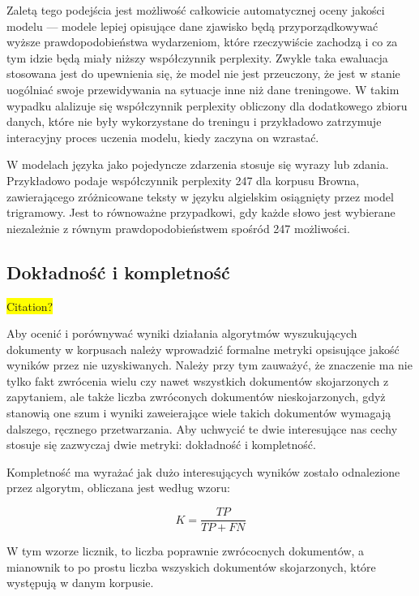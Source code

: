 \documentclass[11pt,a4paper]{article}
\newcommand{\todo}[1]{\colorbox{yellow}{#1}}
\begin{document}
Zaletą tego podejścia jest możliwość całkowicie automatycznej oceny jakości
modelu --- modele lepiej opisujące dane zjawisko będą przyporządkowywać wyższe
prawdopodobieństwa wydarzeniom, które rzeczywiście zachodzą i co za tym idzie
będą miały niższy współczynnik perplexity. Zwykle taka ewaluacja stosowana jest
do upewnienia się, że model nie jest przeuczony, że jest w stanie uogólniać
swoje przewidywania na sytuacje inne niż dane treningowe. W takim wypadku
alalizuje się współczynnik perplexity obliczony dla dodatkowego zbioru
danych, które nie były wykorzystane do treningu i przykładowo zatrzymuje
interacyjny proces uczenia modelu, kiedy zaczyna on wzrastać.

W modelach języka jako pojedyncze zdarzenia stosuje się wyrazy lub zdania.
Przykładowo \cite{perplexity-estimate} podaje współczynnik perplexity 247 dla
korpusu Browna, zawierającego zróżnicowane teksty w języku algielskim
osiągnięty przez model trigramowy. Jest to równoważne przypadkowi, gdy każde
słowo jest wybierane niezależnie z równym prawdopodobieństwem spośród 247
możliwości.

\subsection{Dokładność i kompletność}

\todo{Citation?}

Aby ocenić i porównywać wyniki działania algorytmów wyszukujących dokumenty w
korpusach należy wprowadzić formalne metryki opsisujące jakość wyników przez
nie uzyskiwanych. Należy przy tym zauważyć, że znaczenie ma nie tylko fakt
zwrócenia wielu czy nawet wszystkich dokumentów skojarzonych z zapytaniem, ale
także liczba zwróconych dokumentów nieskojarzonych, gdyż stanowią one szum i
wyniki zaweierające wiele takich dokumentów wymagają dalszego, ręcznego
przetwarzania. Aby uchwycić te dwie interesujące nas cechy stosuje się
zazwyczaj dwie metryki: dokładność i kompletność.

Kompletność ma wyrażać jak dużo interesujących wyników zostało odnalezione przez
algorytm, obliczana jest według wzoru:

\begin{equation}
  K = \frac{TP}{TP + FN}
\end{equation}

W tym wzorze licznik, to liczba poprawnie zwrócocnych dokumentów, a mianownik
to po prostu liczba wszyskich dokumentów skojarzonych, które występują w danym
korpusie.
\end{document}

